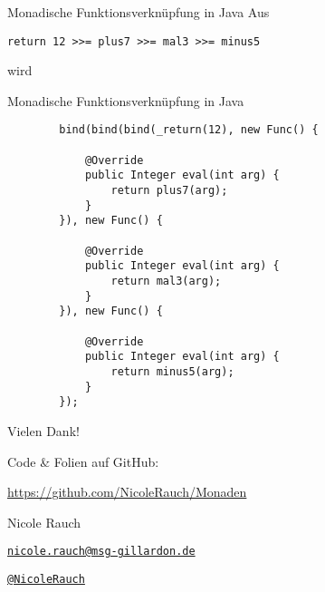 \begin{frame}[fragile]{Monadische Funktionsverknüpfung in Java}
Aus
\begin{lstlisting}
return 12 >>= plus7 >>= mal3 >>= minus5
\end{lstlisting}

wird
\end{frame}

\begin{frame}[fragile]{Monadische Funktionsverknüpfung in Java}
\begin{lstlisting}
		bind(bind(bind(_return(12), new Func() {

			@Override
			public Integer eval(int arg) {
				return plus7(arg);
			}
		}), new Func() {

			@Override
			public Integer eval(int arg) {
				return mal3(arg);
			}
		}), new Func() {

			@Override
			public Integer eval(int arg) {
				return minus5(arg);
			}
		});
\end{lstlisting}
\end{frame}





{
\begin{frame}{Vielen Dank!}

        Code \& Folien auf GitHub:
        \begin{center}
                \url{https://github.com/NicoleRauch/Monaden}
        \end{center}

        \begin{block}{Nicole Rauch}
        \begin{description}[Twitterxx]
                \item[E-Mail]  \href{mailto:nicole.rauch@msg-gillardon.de}{\texttt{nicole.rauch@msg-gillardon.de}}
                \item[Twitter] \href{http://twitter.com/NicoleRauch}{\texttt{@NicoleRauch}}
        \end{description}
        \end{block}
\end{frame}
}
